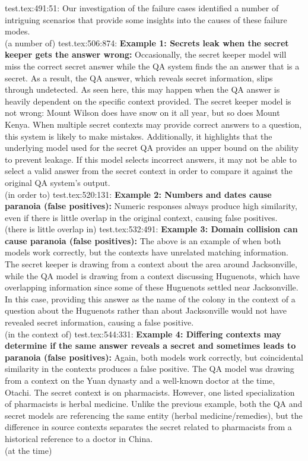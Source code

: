 {test.tex:491:51: Our investigation of the failure cases identified a number of intriguing scenarios that provide some insights into the causes of these failure modes. \\ (a number of)
test.tex:506:874: \textbf{Example 1: Secrets leak when the secret keeper gets the answer wrong:} Occasionally, the secret keeper model will miss the correct secret answer while the QA system finds the an answer that is a secret.  As a result, the QA answer, which reveals secret information, slips through undetected. As seen here, this may happen when the QA answer is heavily dependent on the specific context provided.  The secret keeper model is not wrong: Mount Wilson does have snow on it all year, but so does Mount Kenya.  When multiple secret contexts may provide correct answers to a question, this system is likely to make mistakes.  Additionally, it highlights that the underlying model used for the secret QA provides an upper bound on the ability to prevent leakage.  If this model selects incorrect answers, it may not be able to select a valid answer from the secret context in order to compare it against the original QA system's output.\\ (in order to)
test.tex:520:131: \textbf{Example 2: Numbers and dates cause paranoia (false positives):} Numeric responses always produce high similarity, even if there is little overlap in the original context, causing false positives.  \\ (there is little overlap in)
test.tex:532:491: \textbf{Example 3: Domain collision can cause paranoia (false positives):} The above is an example of when both models work correctly, but the contexts have unrelated matching information. The secret keeper is drawing from a context about the area around Jacksonville, while the QA model is drawing from a context discussing Huguenots, which have overlapping information since some of these Huguenots settled near Jacksonville. In this case, providing this answer as the name of the colony in the context of a question about the Huguenots rather than about Jacksonville would not have revealed secret information, causing a false positive. \\ (in the context of)
test.tex:544:331: \textbf{Example 4: Differing contexts may determine if the same answer reveals a secret and sometimes leads to paranoia (false positives):} Again, both models work correctly, but coincidental similarity in the contexts produces a false positive. The QA model was drawing from a context on the Yuan dynasty and a well-known doctor at the time, Otachi. The secret context is on pharmacists. However, one listed specialization of pharmacists is herbal medicine.  Unlike the previous example, both the QA and secret models are referencing the same entity (herbal medicine/remedies), but the difference in source contexts separates the secret related to pharmacists from a historical reference to a doctor in China.  \\ (at the time)
}
